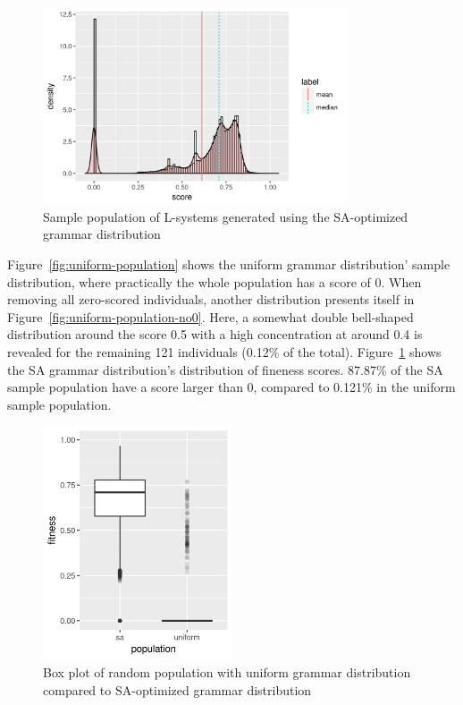 \begin{figure}
    \centering
    \includegraphics[width=0.8\textwidth]{figures/sa-population}
    \caption[L-system population from SA grammar distribution]{Sample population of \glspl{L-system} generated using the \gls{SA}-optimized grammar distribution}
    \label{fig:sa-population}
\end{figure}

Figure~\ref{fig:uniform-population} shows the uniform grammar distribution' sample distribution, where practically the whole population has a score of 0.
When removing all zero-scored individuals, another distribution presents itself in Figure~\ref{fig:uniform-population-no0}.
Here, a somewhat double bell-shaped distribution around the score 0.5 with a high concentration at around 0.4 is revealed for the remaining 121 individuals (0.12\% of the total).
Figure~\ref{fig:sa-population} shows the \gls{SA} grammar distribution's distribution of fineness scores.
87.87\% of the \gls{SA} sample population have a score larger than 0, compared to 0.121\% in the uniform sample population.

\begin{figure}
    \centering
    \includegraphics[width=0.5\textwidth]{figures/sa-uniform}
    \caption[Uniform compared to SA-optimized grammar distribution]{Box plot of random population with uniform grammar distribution compared to \gls{SA}-optimized grammar distribution}
    \label{fig:sa-uniform}
\end{figure}

